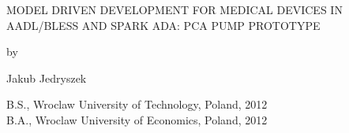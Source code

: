 \begin{center}

   \vspace{1cm}


   \large MODEL DRIVEN DEVELOPMENT FOR MEDICAL DEVICES IN AADL/BLESS AND SPARK ADA: PCA PUMP PROTOTYPE\\

   \vspace{0.3cm}

   by\\

   \vspace{0.3cm}


   \large Jakub Jedryszek\\

   \vspace{0.3cm}


   B.S., Wroclaw University of Technology, Poland, 2012\\
   B.A., Wroclaw University of Economics, Poland, 2012\\


\end{center}
